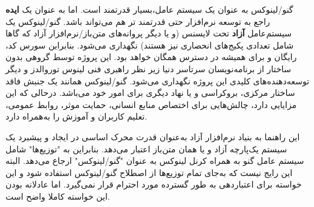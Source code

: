 گنو/لینوکس به عنوان یک سیستم عامل،بسیار قدرتمند است. اما به عنوان یک
{\bfseries ایده}
راجع به توسعه نرم‌افزار حتی قدرتمند تر هم می‌تواند باشد. گنو/لینوکس یک سیستم‌عامل
{\bfseries آزاد}
تحت لایسنس
(و یا دیگر پروانه‌های متن‌باز/نرم‌افزار آزاد که گاها شامل تعدادی پکیج‌های انحصاری نیز هستند) 
نگهداری می‌شود. بنابراین سورس کد، رایگان و برای همیشه در دسترس همگان خواهد بود.
این پروژه توسط گروهی بدون ساختار از برنامه‌نویسان سرتاسر دنیا زیر نظر راهبری فنی
لینوس توروالدز و دیگر توسعه‌دهنده‌های کلیدی این پروژه نگهداری می‌شود.
گنو/لینوکس همانند یک جنبش فاقد ساختار مرکزی، بروکراسی و یا نهاد دیگری برای امور خود می‌باشد.
درحالی که این مزایایی دارد، چالش‌هایی برای اختصاص منابع انسانی، حمایت موثر، روابط عمومی،
تعلیم کاربران و آموزش را به‌همراه دارد.

\begin{note}
این راهنما به بنیاد نرم‌افزار آزاد
به‌عنوان قدرت محرک اساسی در ایجاد و پیشبرد یک سیستم یک‌پارچه آزاد و یا همان متن‌باز اعتبار می‌دهد.
بنابراین به "توزیع‌ها" شامل سیستم عامل گنو به همراه کرنل لینوکس به عنوان "گنو/لینوکس" ارجاع می‌دهد.
البته این رایج نیست که به‌جای تمام توزیع‌ها از اصطلاح گنو/لینوکس استفاده شود و این خواسته
برای اعتباردهی به طور گسترده مورد احترام قرار نمی‌گیرد. اما عادلانه بودن این خواسته کاملا واضح است.
\end{note}


